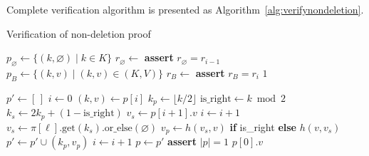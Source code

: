 \documentclass[twocolumn]{article}
\begin{document}
Complete verification algorithm is presented as Algorithm~\ref{alg:verifynondeletion}.

\begin{algorithm}[tb]
  \caption{Verification of non-deletion proof}\label{alg:verifynondeletion}
  \begin{algorithmic}[0]
      \State   {}
      \State   {}
      \State $p_\varnothing \gets \{(k, \varnothing) \mid k \in K\}$ 
      \State $r_\varnothing \gets$ 
      \State \textbf{assert} $r_\varnothing = r_{i-1}$
      \State {}
      \State $p_B \gets \{(k, v) \mid (k,v) \in (K, V)\}$
      \State $r_B \gets$ 
      \State \textbf{assert} $r_B = r_i$
      \State \Return $1$ 
    \EndFunction

        \State $p' \gets [\,]$
        \State $i \gets 0$
          \State $(k, v) \gets p[i]$
          \State $k_p \gets \lfloor k / 2 \rfloor$ 
          \State $\text{is\_right} \gets k \bmod 2$
          \State $k_s \gets 2k_p + (1 - \text{is\_right})$ 
            \State $v_s \gets p[i+1].v$  
            \State $i \gets i + 1$       
          \Else                          {}
            \State                       {}
            \State $v_s \gets \pi[\ell].\text{get}(k_s).\text{or\_else}( \varnothing)$
          \EndIf
          \State $v_p \gets h(v_s, v)$ \textbf{if} is\_right \textbf{else} $h(v, v_s)$
          \State $p' \gets p' \cup (k_p, v_p)$
          \State $i \gets i + 1$
        \EndWhile
        \State $p \gets p'$
      \EndFor
      \State \textbf{assert} $|p| = 1$ 
      \State \Return $p[0].v$ 
    \EndFunction
  \end{algorithmic}
\end{algorithm}
\end{document}
